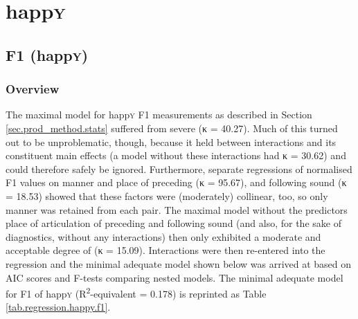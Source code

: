 	\section{happ\textrm{\textsc{y}}}
	\label{sec.prod.res.vow.happy}	

		\subsection{F1 (happ\textrm{\textsc{y}})}
		\label{sec.prod.res.vow.happy.f1}
		
			\subsubsection{Overview}
			\label{sec.prod.res.vow.happy.f1.overview}

The maximal model for happ\textsc{y} F1 measurements as described in Section \ref{sec.prod_method.stats} suffered from severe  (κ = 40.27).
Much of this  turned out to be unproblematic, though, because it held between interactions and its constituent main effects (a model without these interactions had κ = 30.62) and could therefore safely be ignored.
Furthermore, separate regressions of normalised F1 values on manner and place of preceding (κ = 95.67), and following sound (κ = 18.53) showed that these factors were (moderately) collinear, too, so only manner was retained from each pair.
The maximal model without the predictors place of articulation of preceding and following sound (and also, for the sake of diagnostics, without any interactions) then only exhibited a moderate and acceptable degree of  (κ = 15.09).
Interactions were then re-entered into the regression and the minimal adequate model shown below was arrived at based on AIC scores and F-tests comparing nested models.
The minimal adequate model for F1 of happ\textsc{y} (R\textsuperscript{2}-equivalent = 0.178) is reprinted as Table \ref{tab.regression.happy.f1}.
		
